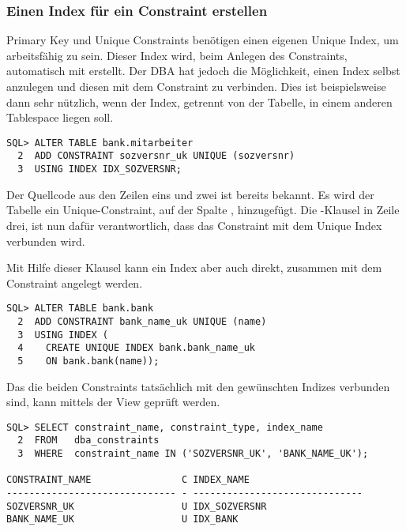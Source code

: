         \subsubsection{Einen Index für ein Constraint erstellen}
          Primary Key und Unique Constraints benötigen einen eigenen Unique Index, um arbeitsfähig zu sein. Dieser Index wird, beim Anlegen des Constraints, automatisch mit erstellt. Der DBA hat jedoch die Möglichkeit, einen Index selbst anzulegen und diesen mit dem Constraint zu verbinden. Dies ist beispielsweise dann sehr nützlich, wenn der Index, getrennt von der Tabelle, in einem anderen Tablespace liegen soll.
          \begin{lstlisting}[caption={Ein Unique Constraint mit einem Index verbinden},label=admin316,language=oracle_sql]
SQL> ALTER TABLE bank.mitarbeiter
  2  ADD CONSTRAINT sozversnr_uk UNIQUE (sozversnr)
  3  USING INDEX IDX_SOZVERSNR;
          \end{lstlisting}
          Der Quellcode aus den Zeilen eins und zwei ist bereits bekannt. Es wird der Tabelle  ein Unique-Constraint, auf der Spalte , hinzugefügt. Die -Klausel in Zeile drei, ist nun dafür verantwortlich, dass das Constraint  mit dem Unique Index  verbunden wird.

          Mit Hilfe dieser Klausel kann ein Index aber auch direkt, zusammen mit dem Constraint angelegt werden.
\clearpage
          \begin{lstlisting}[caption={Ein Unique Constraint zusammen mit einem Index erstellen},label=admin317,language=oracle_sql]
SQL> ALTER TABLE bank.bank
  2  ADD CONSTRAINT bank_name_uk UNIQUE (name)
  3  USING INDEX (
  4    CREATE UNIQUE INDEX bank.bank_name_uk
  5    ON bank.bank(name));
          \end{lstlisting}
          Das die beiden Constraints tatsächlich mit den gewünschten Indizes verbunden sind, kann mittels der View  geprüft werden.
          \begin{lstlisting}[caption={Die View \identifier{dba\_constraints}},label=admin318,language=oracle_sql]
SQL> SELECT constraint_name, constraint_type, index_name
  2  FROM   dba_constraints
  3  WHERE  constraint_name IN ('SOZVERSNR_UK', 'BANK_NAME_UK');

CONSTRAINT_NAME                C INDEX_NAME
------------------------------ - ------------------------------
SOZVERSNR_UK                   U IDX_SOZVERSNR
BANK_NAME_UK                   U IDX_BANK
          \end{lstlisting}
